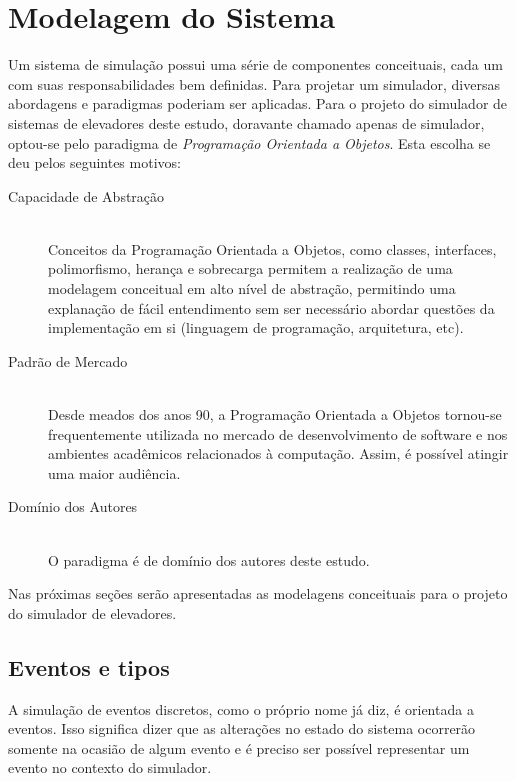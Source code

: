 \chapter{\label{chap:modeling}Modelagem do Sistema}

Um sistema de simulação possui uma série de componentes conceituais, cada um com
suas responsabilidades bem definidas. Para projetar um simulador, diversas
abordagens e paradigmas poderiam ser aplicadas. Para o projeto do simulador de
sistemas de elevadores deste estudo, doravante chamado apenas de simulador,
optou-se pelo paradigma de \textit{Programação Orientada a Objetos}. Esta
escolha se deu pelos seguintes motivos:

\begin{description}
  \item[Capacidade de Abstração]\hfill \\
    Conceitos da Programação Orientada a Objetos, como classes, interfaces,
    polimorfismo, herança e sobrecarga permitem a realização de uma modelagem
    conceitual em alto nível de abstração, permitindo uma explanação de fácil
    entendimento sem ser necessário abordar questões da implementação em si
    (linguagem de programação, arquitetura, etc).
  \item[Padrão de Mercado]\hfill \\
    Desde meados dos anos 90, a Programação Orientada a Objetos tornou-se
    frequentemente utilizada no mercado de desenvolvimento de software e nos
    ambientes acadêmicos relacionados à computação. Assim, é possível atingir
    uma maior audiência.
  \item[Domínio dos Autores]\hfill \\
    O paradigma é de domínio dos autores deste estudo.
\end{description}

Nas próximas seções serão apresentadas as modelagens conceituais para o projeto
do simulador de elevadores.

\section{\label{sec:eventos-e-tipos}Eventos e tipos}

A simulação de eventos discretos, como o próprio nome já diz, é orientada a
eventos. Isso significa dizer que as alterações no estado do sistema ocorrerão
somente na ocasião de algum evento e é preciso ser possível representar um
evento no contexto do simulador.

